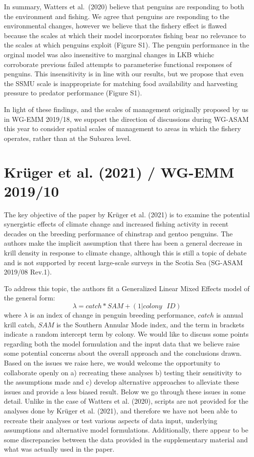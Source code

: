\documentclass[]{elsarticle} %
\begin{document}
In summary, Watters et al.~(2020) believe that penguins are responding
to both the environment and fishing. We agree that penguins are
responding to the environmental changes, however we believe that the
fishery effect is flawed because the scales at which their model
incorporates fishing bear no relevance to the scales at which penguins
exploit (Figure S1). The penguin performance in the orginal model was
also insensitive to marginal changes in LKB whichc corroborate previous
failed attempts to parameterise functional responses of penguins. This
insensitivity is in line with our results, but we propose that even the
SSMU scale is inappropriate for matching food availability and
harvesting pressure to predator performance (Figure S1).

In light of these findings, and the scales of management originally
proposed by us in WG-EMM 2019/18, we support the direction of
discussions during WG-ASAM this year to consider spatial scales of
management to areas in which the fishery operates, rather than at the
Subarea level.

\hypertarget{kruger2021-wg-emm-201910}{%
\section{Krüger et al. (2021) / WG-EMM
2019/10}\label{kruger2021-wg-emm-201910}}

The key objective of the paper by Krüger et al. (2021) is to examine the
potential synergistic effects of climate change and increased fishing
activity in recent decades on the breeding performance of chinstrap and
gentoo penguins. The authors make the implicit assumption that there has
been a general decrease in krill density in response to climate change,
although this is still a topic of debate and is not supported by recent
large-scale surveys in the Scotia Sea (SG-ASAM 2019/08 Rev.1).

To address this topic, the authors fit a Generalized Linear Mixed
Effects model of the general form:
\[\lambda=catch*SAM+(1|colony\text{ }ID)\] where \(\lambda\) is an index
of change in penguin breeding performance, \(catch\) is annual krill
catch, \(SAM\) is the Southern Annular Mode index, and the term in
brackets indicate a random intercept term by colony. We would like to
discuss some points regarding both the model formulation and the input
data that we believe raise some potential concerns about the overall
approach and the conclusions drawn. Based on the issues we raise here,
we would welcome the opportunity to collaborate openly on a) recreating
these analyses b) testing their sensitivity to the assumptions made and
c) develop alternative approaches to alleviate these issues and provide
a less biased result. Below we go through these issues in some detail.
Unlike in the case of Watters et al. (2020), scripts are not provided
for the analyses done by Krüger et al. (2021), and therefore we have not
been able to recreate their analyses or test various aspects of data
input, underlying assumptions and alternative model formulations.
Additionally, there appear to be some discrepancies between the data
provided in the supplementary material and what was actually used in the
paper.
\end{document}
